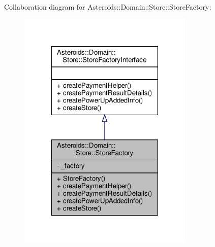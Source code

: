 Collaboration diagram for Asteroids\+:\+:Domain\+:\+:Store\+:\+:Store\+Factory\+:\nopagebreak
\begin{figure}[H]
\begin{center}
\leavevmode
\includegraphics[width=237pt]{classAsteroids_1_1Domain_1_1Store_1_1StoreFactory__coll__graph}
\end{center}
\end{figure}
